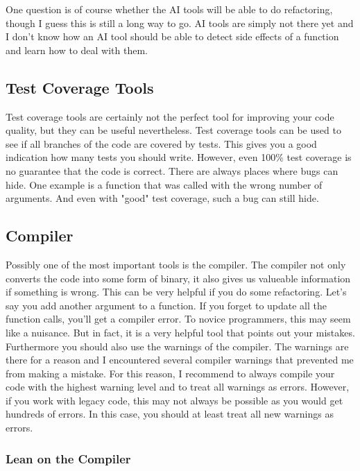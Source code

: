 One question is of course whether the AI tools will be able to do refactoring, though I guess this is still a long way to go. AI tools are simply not there yet and I don't know how an AI tool should be able to detect side effects of a function and learn how to deal with them.

\subsection{Test Coverage Tools}

Test coverage tools are certainly not the perfect tool for improving your code quality, but they can be useful nevertheless. Test coverage tools can be used to see if all branches of the code are covered by tests. This gives you a good indication how many tests you should write. However, even 100\% test coverage is no guarantee that the code is correct. There are always places where bugs can hide. One example is a function that was called with the wrong number of arguments. And even with "good" test coverage, such a bug can still hide.

\subsection{Compiler}

Possibly one of the most important tools is the compiler. The compiler not only converts the code into some form of binary, it also gives us valueable information if something is wrong. This can be very helpful if you do some refactoring. Let's say you add another argument to a function. If you forget to update all the function calls, you'll get a compiler error. To novice programmers, this may seem like a nuisance. But in fact, it is a very helpful tool that points out your mistakes. Furthermore you should also use the warnings of the compiler. The warnings are there for a reason and I encountered several compiler warnings that prevented me from making a mistake. For this reason, I recommend to always compile your code with the highest warning level and to treat all warnings as errors. However, if you work with legacy code, this may not always be possible as you would get hundreds of errors. In this case, you should at least treat all new warnings as errors.


\subsubsection*{Lean on the Compiler}

